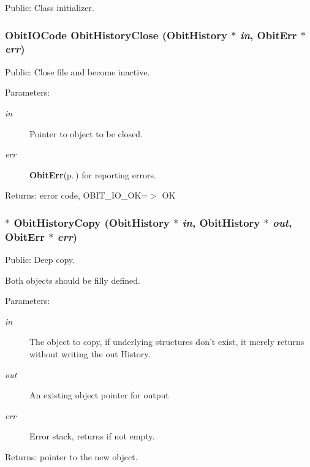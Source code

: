 Public: Class initializer. 

\subsubsection{\setlength{\rightskip}{0pt plus 5cm}Obit\-IOCode Obit\-History\-Close ({\bf Obit\-History} $\ast$ {\em in}, {\bf Obit\-Err} $\ast$ {\em err})}\label{ObitHistory_8h_a18}


Public: Close file and become inactive. 

\begin{Desc}
\item[Parameters:]
\begin{description}
\item[{\em in}]Pointer to object to be closed. \item[{\em err}]{\bf Obit\-Err}{\rm (p.\,\pageref{structObitErr})} for reporting errors. \end{description}
\end{Desc}
\begin{Desc}
\item[Returns:]error code, OBIT\_\-IO\_\-OK=$>$ OK \end{Desc}
\subsubsection{$\ast$ Obit\-History\-Copy ({\bf Obit\-History} $\ast$ {\em in}, {\bf Obit\-History} $\ast$ {\em out}, {\bf Obit\-Err} $\ast$ {\em err})}\label{ObitHistory_8h_a13}


Public: Deep copy. 

Both objects should be filly defined. \begin{Desc}
\item[Parameters:]
\begin{description}
\item[{\em in}]The object to copy, if underlying structures don't exist, it merely returns without writing the out History. \item[{\em out}]An existing object pointer for output \item[{\em err}]Error stack, returns if not empty. \end{description}
\end{Desc}
\begin{Desc}
\item[Returns:]pointer to the new object. \end{Desc}

